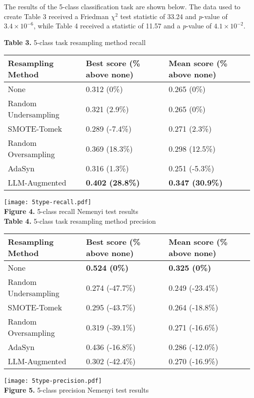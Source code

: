 \documentclass[runningheads]{llncs}
\newenvironment{nscenter}
 {\parskip=0pt\par\nopagebreak\centering}
 {\par\noindent\ignorespacesafterend}
\begin{document}
The results of the 5-class classification task are shown below. The data used to create Table 3 received a Friedman $\chi^2$ test statistic of 33.24 and \emph{p}-value of $3.4 \times 10^{-6}$, while Table 4 received a statistic of 11.57 and a \emph{p}-value of $4.1 \times 10^{-2}$.
\begin{nscenter}
{\bf Table 3.} 5-class task resampling method recall\\

\begin{tabular}{|l|l|l|}
\hline
Resampling Method & Best score (\% above none) & Mean score (\% above none) \\\hline
None & 0.312 (0\%) & 0.265 (0\%) \\\hline
Random Undersampling & 0.321 (2.9\%) & 0.265 (0\%) \\\hline
SMOTE-Tomek & 0.289 (-7.4\%) & 0.271 (2.3\%) \\\hline
Random Oversampling & 0.369 (18.3\%) & 0.298 (12.5\%) \\\hline
AdaSyn & 0.316 (1.3\%) & 0.251 (-5.3\%) \\\hline
LLM-Augmented & {\bf 0.402 (28.8\%)} & {\bf 0.347 (30.9\%)} \\\hline
\end{tabular}

\texttt{[image: 5type-recall.pdf]}\\
{\bf Figure 4.} 5-class recall Nemenyi test results\\
\vspace{\baselineskip}
{\bf Table 4.} 5-class task resampling method precision\\

\begin{tabular}{|l|l|l|}
\hline
Resampling Method & Best score (\% above none) & Mean score (\% above none) \\\hline
None & {\bf 0.524 (0\%)} & {\bf 0.325 (0\%)} \\\hline
Random Undersampling & 0.274 (-47.7\%) & 0.249 (-23.4\%) \\\hline
SMOTE-Tomek & 0.295 (-43.7\%) & 0.264 (-18.8\%) \\\hline
Random Oversampling & 0.319 (-39.1\%) & 0.271 (-16.6\%) \\\hline
AdaSyn & 0.436 (-16.8\%) & 0.286 (-12.0\%) \\\hline
LLM-Augmented & 0.302 (-42.4\%) & 0.270 (-16.9\%) \\\hline
\end{tabular}

\texttt{[image: 5type-precision.pdf]}\\
{\bf Figure 5.} 5-class precision Nemenyi test results
\end{nscenter}
\end{document}
